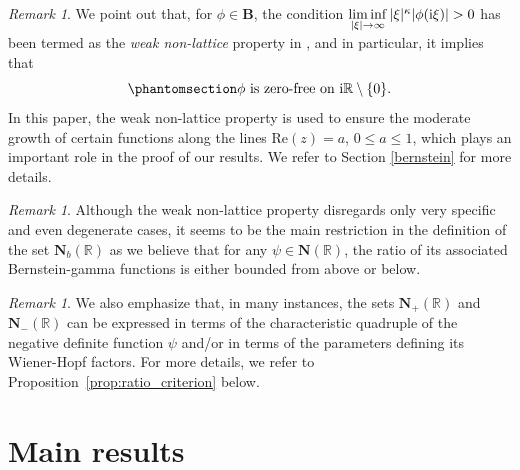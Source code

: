 \documentclass[12pt]{amsart}
\newcommand{\hlabel}{\phantomsection\label}
\numberwithin{equation}{section}
\newcommand{\bb}{\mathbb}
\renewcommand{\le}{\leqslant}
\renewcommand{\Re}{\textrm{Re}}
\newcommand{\bmrm}[2][2]{\mathbf{#2}^{#1}}
\newcommand{\B}{\mathbf{B}}
\theoremstyle{definition}
\theoremstyle{assump}
\theoremstyle{remark}
\newtheorem{rem}[thm]{Remark}
\begin{document}
\begin{rem}
We point out that, for $\phi\in\B$, the condition $\liminf\limits_{|\xi|\to\infty}|\xi|^\kappa|\phi({\rm{i}}\xi  )|>0$ has been termed as the \emph{weak non-lattice} property in \cite[(2.29)]{patie2018}, and in particular, it implies that
\begin{equation}\hlabel{eq:zerofree}
  \phi \ \mbox{is zero-free on ${\rm{i}}\bb{R}\setminus\{0\}$}.
\end{equation}
In this paper, the weak non-lattice property is used to ensure the moderate growth of certain functions along the lines $\Re(z)=a$, $0\le a\le1$, which plays an important role in the proof of our results. We refer to Section \ref{bernstein} for more details.
\end{rem}
\begin{rem}\label{rem:cond}
Although the weak non-lattice property disregards only very specific and even degenerate cases,  it seems to be the main restriction in the definition of the set $\mathbf{N}_b(\bb{R})$ as we believe that for any $\psi \in \mathbf{N}(\bb{R})$, the ratio of its associated Bernstein-gamma functions is either bounded from above or below.
\end{rem}
 \begin{rem}
 We also emphasize that, in many instances, the sets $\mathbf{N}_+(\bb{R})$ and $\mathbf{N}_-(\bb{R})$ can be expressed in terms of the characteristic quadruple of the negative definite function $\psi$ and/or in terms of the parameters defining its  Wiener-Hopf factors. For more details, we refer  to Proposition~\ref{prop:ratio_criterion} below.
 \end{rem}


\section{Main results}\hlabel{sec:main}
\end{document}
